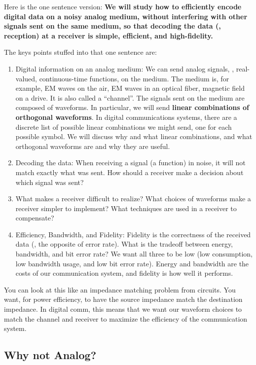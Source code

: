 Here is the one sentence version:  {\bf We will study how to efficiently encode digital data on a noisy analog medium, without interfering with other signals sent on the same medium, so that decoding the data (\ie, reception) at a receiver is simple, efficient, and high-fidelity.}

The keys points stuffed into that one sentence are:
\begin{enumerate}
 \item Digital information on an analog medium:  We can send analog signals, \ie, real-valued, continuous-time functions, on the medium.  The medium is, for example, EM waves on the air, EM waves in an optical fiber, magnetic field on a drive.  It is also called a ``channel''.  The signals sent on the medium are composed of waveforms.  In particular, we will send {\bf linear combinations of orthogonal waveforms}.  In digital communications systems, there are a discrete list of possible linear combinations we might send, one for each possible symbol.  We will discuss why and what linear combinations, and what orthogonal waveforms are and why they are useful.
 \item Decoding the data:  When receiving a signal (a function) in noise, it will not match exactly what was sent.  How should a receiver make a decision about which signal was sent?
 \item What makes a receiver difficult to realize?  What choices of waveforms make a receiver simpler to implement?  What techniques are used in a receiver to compensate?
 \item Efficiency, Bandwidth, and Fidelity:  Fidelity is the correctness of the received data (\ie, the opposite of error rate).  What is the tradeoff between energy, bandwidth, and bit error rate?  We want all three to be low (low consumption, low bandwidth usage, and low bit error rate).  Energy and bandwidth are the costs of our communication system, and fidelity is how well it performs.
\end{enumerate}
You can look at this like an impedance matching problem from circuits.  You want, for power efficiency, to have the source impedance match the destination impedance.  In digital comm, this means that we want our waveform choices to match the channel and receiver to maximize the efficiency of the communication system.



\subsection{Why not Analog?}

